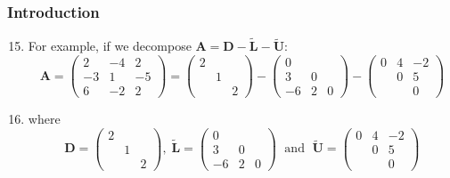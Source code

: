 \documentclass[10pt,compress,handout,ignorenonframetext]{beamer}
\begin{document}
\begin{frame}
  \frametitle{Introduction} 
  \begin{enumerate}
  \setcounter{enumi}{14}
     \item <1-> For example, if we decompose $\bm{A} = \bm{D} - \tilde{\bm{L}} -\tilde{\bm{U}}$:
        \begin{displaymath}
          \bm{A}=\begin{pmatrix} 2 & -4 & 2 \\ -3 & 1 & -5 \\ 6 & -2 & 2\end{pmatrix} = \begin{pmatrix}2 &  & \\ & 1 & \\ & & 2 \end{pmatrix} - \begin{pmatrix}0 &  & \\ 3 & 0 & \\ -6 & 2 & 0 \end{pmatrix} - \begin{pmatrix} 0 & 4 & -2 \\ & 0 & 5 \\ & & 0 \end{pmatrix}
         \end{displaymath}
     \item <2-> where 
         \begin{displaymath}
          \bm{D}=\begin{pmatrix}2 &  & \\ & 1 & \\ & & 2 \end{pmatrix},\;\tilde{\bm{L}} = \begin{pmatrix}0 &  & \\ 3 & 0 & \\ -6 & 2 & 0 \end{pmatrix} \;\text{ and }\;\tilde{\bm{U}} = \begin{pmatrix} 0 & 4 & -2 \\ & 0 & 5 \\ & & 0 \end{pmatrix}
          \end{displaymath}
  \end{enumerate}
\end{frame}
\end{document}
